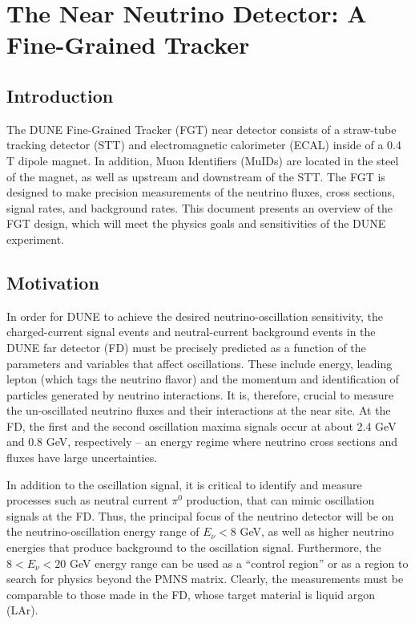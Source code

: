 
\chapter{The Near Neutrino Detector: A Fine-Grained Tracker}
\label{ch:nd-nnd}

\section{Introduction} 
\label{sec:nd-nnd-intro}

The DUNE Fine-Grained Tracker (FGT) near detector consists of a straw-tube
tracking detector (STT) and electromagnetic calorimeter (ECAL) inside of a 0.4 T
dipole magnet. In addition, Muon Identifiers (MuIDs) are located in the
steel of the magnet, as well as upstream and downstream of the STT. The FGT
is designed to make precision measurements of the neutrino fluxes, 
cross sections, signal rates, and background rates. 
This document presents an overview of the FGT design, which 
will meet the physics goals and sensitivities of the DUNE experiment. 

\section{Motivation}
\label{sec:nd-nnd-motivation}

In order for DUNE to achieve the desired neutrino-oscillation sensitivity, the 
charged-current signal events
and neutral-current
background events in the DUNE far detector (FD) must be precisely 
predicted as a function of the parameters and variables that affect 
oscillations. These include energy, leading lepton (which tags the neutrino flavor) and the 
momentum and identification of particles generated by neutrino interactions. 
It is, therefore, crucial to measure the un-oscillated neutrino fluxes and 
their interactions at the near site. At the FD, the first and the second 
oscillation maxima signals occur at about 2.4 GeV and 0.8 GeV, respectively 
-- an energy regime where neutrino cross sections and fluxes have large 
uncertainties. 

In addition to the oscillation signal, it is 
critical to identify and measure processes such as neutral current $\pi^0$ production,
that can mimic oscillation signals 
at the FD. Thus, the principal focus of the neutrino detector will be 
on the neutrino-oscillation energy range of $E_\nu < 8$ GeV, as well as higher 
neutrino energies that produce background to the oscillation signal. Furthermore, the
$8<E_\nu < 20$ GeV energy range can be used as a ``control region'' or
as a region
to search for physics beyond the PMNS matrix. Clearly, 
the measurements must be 
comparable to those made in the FD, whose target material is liquid argon (LAr). 

